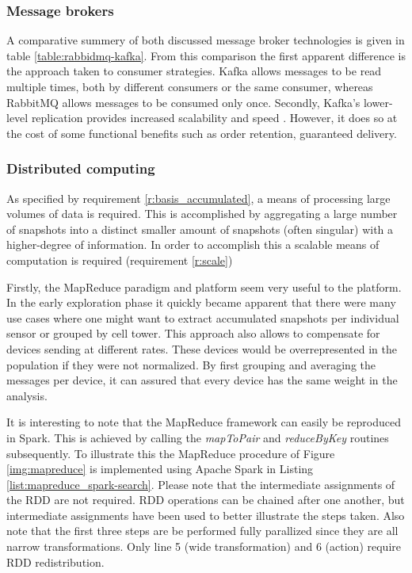 \subsubsection*{Message brokers}

A comparative summery of both discussed message broker technologies is given in table \ref{table:rabbidmq-kafka}. From this comparison the first apparent difference is the approach taken to consumer strategies. Kafka allows messages to be read multiple times, both by different consumers or the same consumer, whereas RabbitMQ allows messages to be consumed only once. Secondly, Kafka's lower-level replication provides increased scalability and speed \cite{kafka_vs_rabbitmq}. However, it does so at the cost of some functional benefits such as order retention, guaranteed delivery.

\subsubsection{Distributed computing}
As specified by requirement \ref{r:basis_accumulated}, a means of processing large volumes of data is required. This is accomplished by aggregating a large number of snapshots into a distinct smaller amount of snapshots (often singular) with a higher-degree of information. In order to accomplish this a scalable means of computation is required (requirement \ref{r:scale}) 

Firstly, the MapReduce paradigm and platform seem very useful to the platform. In the early exploration phase it quickly became apparent that there were many use cases where one might want to extract accumulated snapshots per individual sensor or grouped by cell tower. This approach also allows to compensate for devices sending at different rates. These devices would be overrepresented in the population if they were not normalized. By first grouping and averaging the messages per device, it can assured that every device has the same weight in the analysis.




It is interesting to note that the MapReduce framework can easily be reproduced in Spark. This is achieved by calling the \emph{mapToPair} and \emph{reduceByKey} routines subsequently. To illustrate this the MapReduce procedure of Figure \ref{img:mapreduce} is implemented using Apache Spark in Listing \ref{list:mapreduce_spark-search}. Please note that the intermediate assignments of the RDD are not required. RDD operations can be chained after one another, but intermediate assignments have been used to better illustrate the steps taken. Also note that the first three steps are be performed fully parallized since they are all narrow transformations. Only line 5 (wide transformation) and 6 (action) require RDD redistribution.

